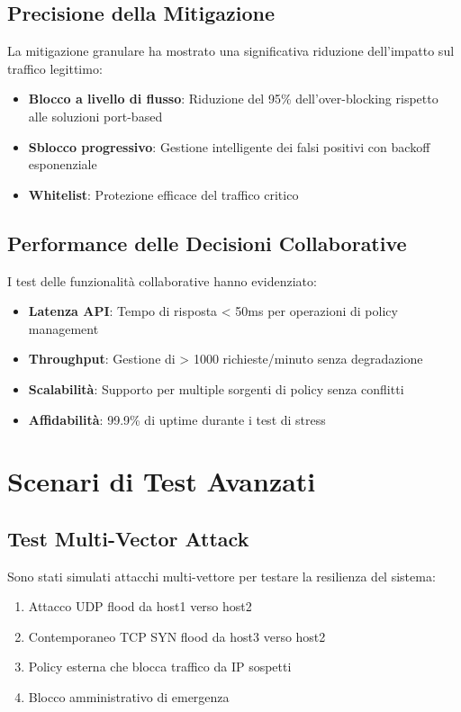 \subsection{Precisione della Mitigazione}
La mitigazione granulare ha mostrato una significativa riduzione dell'impatto sul traffico legittimo:
\begin{itemize}
    \item \textbf{Blocco a livello di flusso}: Riduzione del 95\% dell'over-blocking rispetto alle soluzioni port-based
    \item \textbf{Sblocco progressivo}: Gestione intelligente dei falsi positivi con backoff esponenziale
    \item \textbf{Whitelist}: Protezione efficace del traffico critico
\end{itemize}

\subsection{Performance delle Decisioni Collaborative}
I test delle funzionalità collaborative hanno evidenziato:
\begin{itemize}
    \item \textbf{Latenza API}: Tempo di risposta < 50ms per operazioni di policy management
    \item \textbf{Throughput}: Gestione di > 1000 richieste/minuto senza degradazione
    \item \textbf{Scalabilità}: Supporto per multiple sorgenti di policy senza conflitti
    \item \textbf{Affidabilità}: 99.9\% di uptime durante i test di stress
\end{itemize}

\section{Scenari di Test Avanzati}

\subsection{Test Multi-Vector Attack}
Sono stati simulati attacchi multi-vettore per testare la resilienza del sistema:
\begin{enumerate}
    \item Attacco UDP flood da host1 verso host2
    \item Contemporaneo TCP SYN flood da host3 verso host2  
    \item Policy esterna che blocca traffico da IP sospetti
    \item Blocco amministrativo di emergenza
\end{enumerate}

